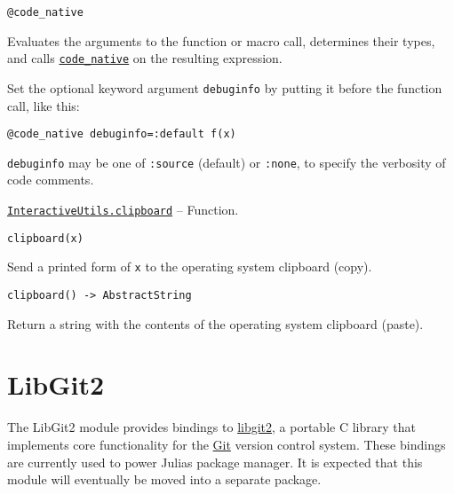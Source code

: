 \begin{adjustwidth}{2em}{0pt}


\begin{verbatim}
@code_native
\end{verbatim}

Evaluates the arguments to the function or macro call, determines their types, and calls \hyperlink{2534314152947301270}{\texttt{code\_native}} on the resulting expression.

Set the optional keyword argument \texttt{debuginfo} by putting it before the function call, like this:


\begin{lstlisting}
@code_native debuginfo=:default f(x)
\end{lstlisting}

\texttt{debuginfo} may be one of \texttt{:source} (default) or \texttt{:none}, to specify the verbosity of code comments.



\end{adjustwidth}
\hypertarget{17688389159658604177}{} 
\hyperlink{17688389159658604177}{\texttt{InteractiveUtils.clipboard}}  -- {Function.}

\begin{adjustwidth}{2em}{0pt}


\begin{verbatim}
clipboard(x)
\end{verbatim}

Send a printed form of \texttt{x} to the operating system clipboard ({\textquotedbl}copy{\textquotedbl}).




\begin{lstlisting}
clipboard() -> AbstractString
\end{lstlisting}

Return a string with the contents of the operating system clipboard ({\textquotedbl}paste{\textquotedbl}).



\end{adjustwidth}

\hypertarget{14272245692301851811}{}


\chapter{LibGit2}



The LibGit2 module provides bindings to \href{https://libgit2.org/}{libgit2}, a portable C library that implements core functionality for the \href{https://git-scm.com/}{Git} version control system. These bindings are currently used to power Julia{\textquotesingle}s package manager. It is expected that this module will eventually be moved into a separate package.



